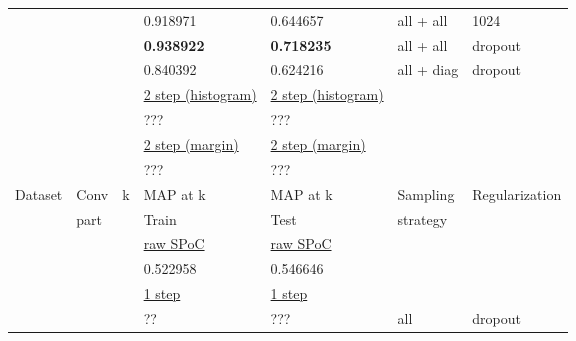 \documentclass[a4paper,12pt]{extreport}
\begin{document}
\begin{longtable}[h!]{|l|l|l|l|l|l|l|}
            & & & 0.918971 & 0.644657 & all + all & 1024 \\
            & & & \textbf{0.938922} & \textbf{0.718235} & all + all & dropout              \\
            & & & 0.840392 & 0.624216 & all + diag & dropout              \\ \cline{4-7}
            & & & \underline{2 step (histogram)} & \underline{2 step (histogram)} & &                      \\
            & & & ??? & ??? & &                      \\ \cline{4-7}
            & & & \underline{2 step (margin)}    & \underline{2 step (margin)}    & &                      \\
            & & & ??? & ??? & &                      \\ \hline \hline
            Dataset & Conv & k & MAP at k & MAP at k & Sampling & Regularization       \\
            & part & & Train & Test & strategy &                      \\ \hline
            & & & \underline{raw SPoC} & \underline{raw SPoC} & &                      \\
            & & & 0.522958 & 0.546646 & &                      \\\cline{4-7}
            & & & \underline{1 step}   & \underline{1 step}   & &                      \\
            & & & ?? & ??? & all & dropout                  \\ \cline{4-7}


\end{longtable}
\end{document}
